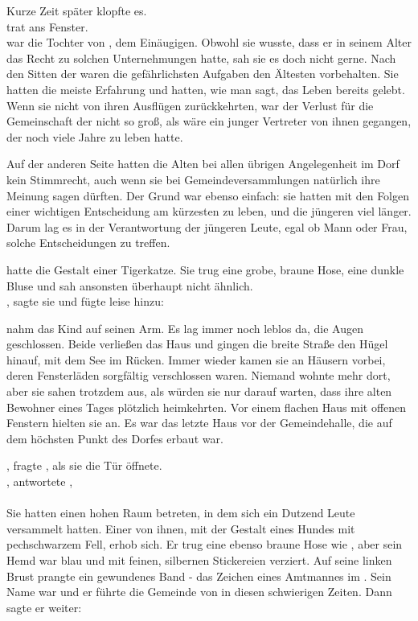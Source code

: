 \begin{huge}
Kurze Zeit später klopfte es.\\
{\Bomar} trat ans Fenster. \\
{\Mena} war die Tochter von {\Eno}, dem Einäugigen. Obwohl sie wusste, dass er in seinem Alter das Recht zu solchen Unternehmungen hatte, sah sie es doch nicht gerne. Nach den Sitten der {\Schattenlaufer} waren die gefährlichsten Aufgaben den Ältesten vorbehalten. Sie hatten die meiste Erfahrung und hatten, wie man sagt, das Leben bereits gelebt. Wenn sie nicht von ihren Ausflügen zurückkehrten, war der Verlust für die Gemeinschaft der {\Schattenlaufer} nicht so groß, als wäre ein junger Vertreter von ihnen gegangen, der noch viele Jahre zu leben hatte. 

Auf der anderen Seite hatten die Alten bei allen übrigen Angelegenheit im Dorf kein Stimmrecht, auch wenn sie bei Gemeindeversammlungen natürlich ihre Meinung sagen dürften. Der Grund war ebenso einfach: sie hatten mit den Folgen einer wichtigen Entscheidung am kürzesten zu leben, und die jüngeren viel länger. Darum lag es in der Verantwortung der jüngeren Leute, egal ob Mann oder Frau, solche Entscheidungen zu treffen.

{\Mena} hatte die Gestalt einer Tigerkatze. Sie trug eine grobe, braune Hose, eine dunkle Bluse und sah {\Nox} ansonsten überhaupt nicht ähnlich.\\
, sagte sie und fügte leise hinzu: 

{\Eno} nahm das Kind auf seinen Arm. Es lag immer noch leblos da, die Augen geschlossen.
Beide verließen das Haus und gingen die breite Straße den Hügel hinauf, mit dem See im Rücken. 
Immer wieder kamen sie an Häusern vorbei, deren Fensterläden sorgfältig verschlossen waren. Niemand wohnte mehr dort, aber sie sahen trotzdem aus, als würden sie nur darauf warten, dass ihre alten Bewohner eines Tages plötzlich heimkehrten. Vor einem flachen Haus mit offenen Fenstern hielten sie an. Es war das letzte Haus vor der Gemeindehalle, die auf dem höchsten Punkt des Dorfes erbaut war.

, fragte {\Mena}, als sie die Tür öffnete.\\
, antwortete {\Eno}, \\
\\
Sie hatten einen hohen Raum betreten, in dem sich ein Dutzend Leute versammelt hatten. Einer von ihnen, mit der Gestalt eines Hundes mit pechschwarzem Fell, erhob sich. Er trug eine ebenso braune Hose wie {\Mena}, aber sein Hemd war blau und mit feinen, silbernen Stickereien verziert. Auf seine linken Brust prangte ein gewundenes Band - das Zeichen eines Amtmannes im {\Enland}. Sein Name war {\Nox} und er führte die Gemeinde von {\Berna} in diesen schwierigen Zeiten. Dann sagte er weiter: 


\end{huge}
